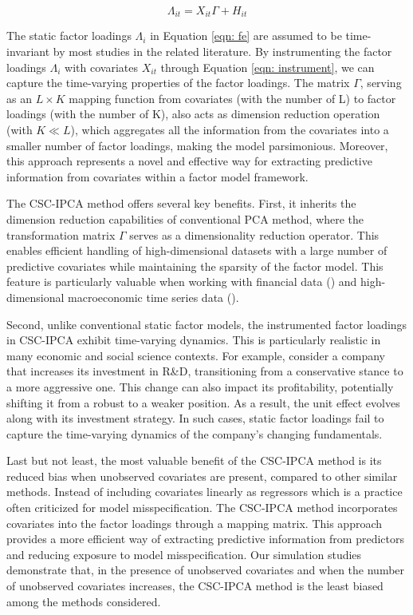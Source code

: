 \documentclass[12pt]{article}
\begin{document}
    \begin{equation}
    \label{eqn: instrument}
    \Lambda_{it} = X_{it}\Gamma + H_{it}
\end{equation}

The static factor loadings $\Lambda_i$ in Equation \ref{eqn: fe} are assumed to be time-invariant by most studies in the related literature. By instrumenting the factor loadings $\Lambda_i$ with covariates $X_{it}$ through Equation \ref{eqn: instrument}, we can capture the time-varying properties of the factor loadings. The matrix $\Gamma$, serving as an $L \times K$ mapping function from covariates (with the number of L) to factor loadings (with the number of K), also acts as dimension reduction operation (with $K \ll L$), which aggregates all the information from the covariates into a smaller number of factor loadings, making the model parsimonious. Moreover, this approach represents a novel and effective way for extracting predictive information from covariates within a factor model framework.

The CSC-IPCA method offers several key benefits. First, it inherits the dimension reduction capabilities of conventional PCA method, where the transformation matrix $\Gamma$ serves as a dimensionality reduction operator. This enables efficient handling of high-dimensional datasets with a large number of predictive covariates while maintaining the sparsity of the factor model. This feature is particularly valuable when working with financial data (\cite{feng2020taming}) and high-dimensional macroeconomic time series data (\cite{brave2009chicago}).

Second, unlike conventional static factor models, the instrumented factor loadings in CSC-IPCA exhibit time-varying dynamics. This is particularly realistic in many economic and social science contexts. For example, consider a company that increases its investment in R\&D, transitioning from a conservative stance to a more aggressive one. This change can also impact its profitability, potentially shifting it from a robust to a weaker position. As a result, the unit effect evolves along with its investment strategy. In such cases, static factor loadings fail to capture the time-varying dynamics of the company's changing fundamentals.

Last but not least, the most valuable benefit of the CSC-IPCA method is its reduced bias when unobserved covariates are present, compared to other similar methods. Instead of including covariates linearly as regressors which is a practice often criticized for model misspecification. The CSC-IPCA method incorporates covariates into the factor loadings through a mapping matrix. This approach provides a more efficient way of extracting predictive information from predictors and reducing exposure to model misspecification. Our simulation studies demonstrate that, in the presence of unobserved covariates and when the number of unobserved covariates increases, the CSC-IPCA method is the least biased among the methods considered.
\end{document}
